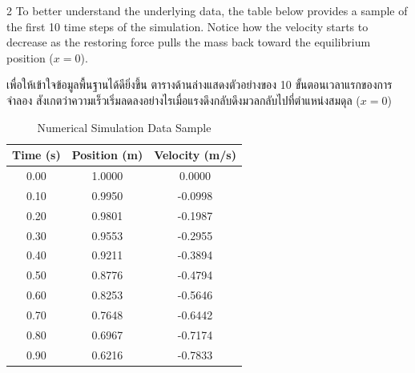 \begin{paracol}{2}
To better understand the underlying data, the table below provides a sample of the first 10 time steps of the simulation. Notice how the velocity starts to decrease as the restoring force pulls the mass back toward the equilibrium position ($x=0$).

\switchcolumn

\begin{thai}
เพื่อให้เข้าใจข้อมูลพื้นฐานได้ดียิ่งขึ้น ตารางด้านล่างแสดงตัวอย่างของ 10 ขั้นตอนเวลาแรกของการจำลอง สังเกตว่าความเร็วเริ่มลดลงอย่างไรเมื่อแรงดึงกลับดึงมวลกลับไปที่ตำแหน่งสมดุล ($x=0$)
\end{thai}
\end{paracol}

\begin{table}[h]
    \centering
    \caption{Numerical Simulation Data Sample}
    \begin{tabular}{ccc}
        \toprule
        Time (s) & Position (m) & Velocity (m/s) \\
        \midrule
        0.00 & 1.0000 & 0.0000 \\
        0.10 & 0.9950 & -0.0998 \\
        0.20 & 0.9801 & -0.1987 \\
        0.30 & 0.9553 & -0.2955 \\
        0.40 & 0.9211 & -0.3894 \\
        0.50 & 0.8776 & -0.4794 \\
        0.60 & 0.8253 & -0.5646 \\
        0.70 & 0.7648 & -0.6442 \\
        0.80 & 0.6967 & -0.7174 \\
        0.90 & 0.6216 & -0.7833 \\
        \bottomrule
    \end{tabular}
\end{table}
